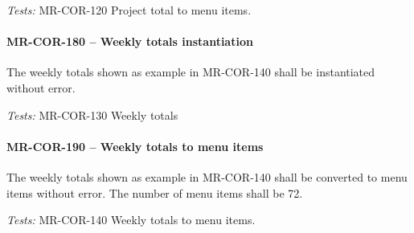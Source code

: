 \textit{Tests: } MR-COR-120 Project total to menu items.

\paragraph{MR-COR-180 -- Weekly totals instantiation}
The weekly totals shown as example in MR-COR-140 shall be
instantiated without error.

\textit{Tests: } MR-COR-130 Weekly totals

\paragraph{MR-COR-190 -- Weekly totals to menu items}
The weekly totals shown as example in MR-COR-140 shall be converted to menu
items without error. The number of menu items shall be 72.

\textit{Tests: } MR-COR-140 Weekly totals to menu items.
